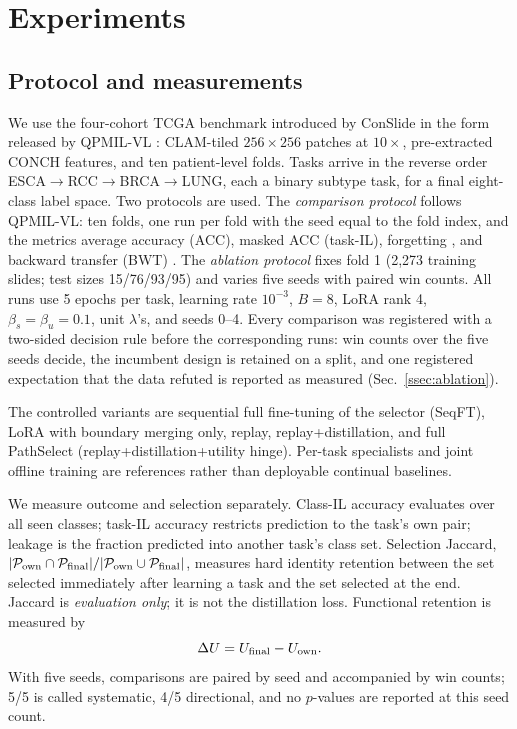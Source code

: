 \documentclass{article}
\newcommand{\Psel}{\mathcal{P}}
\begin{document}
\section{Experiments}
\label{sec:exp}

\subsection{Protocol and measurements}

We use the four-cohort TCGA benchmark introduced by ConSlide \cite{huang2023conslide} in the form released by QPMIL-VL \cite{gou2025qpmil}: CLAM-tiled $256\times256$ patches at $10\times$, pre-extracted CONCH features, and ten patient-level folds. Tasks arrive in the reverse order ESCA$\rightarrow$RCC$\rightarrow$BRCA$\rightarrow$LUNG, each a binary subtype task, for a final eight-class label space. Two protocols are used. The \emph{comparison protocol} follows QPMIL-VL: ten folds, one run per fold with the seed equal to the fold index, and the metrics average accuracy (ACC), masked ACC (task-IL), forgetting \cite{chaudhry2018rwalk}, and backward transfer (BWT) \cite{lopezpaz2017gem}. The \emph{ablation protocol} fixes fold 1 (2,273 training slides; test sizes 15/76/93/95) and varies five seeds with paired win counts.
All runs use 5 epochs per task, learning rate $10^{-3}$, $B=8$, LoRA rank 4, $\beta_s{=}\beta_u{=}0.1$, unit $\lambda$'s, and seeds 0--4. Every comparison was registered with a two-sided decision rule before the corresponding runs: win counts over the five seeds decide, the incumbent design is retained on a split, and one registered expectation that the data refuted is reported as measured (Sec.~\ref{ssec:ablation}).

The controlled variants are sequential full fine-tuning of the selector (SeqFT), LoRA with boundary merging only, replay, replay+distillation, and full PathSelect (replay+distillation+utility hinge).
Per-task specialists and joint offline training are references rather than deployable continual baselines.

We measure outcome and selection separately.
Class-IL accuracy evaluates over all seen classes; task-IL accuracy restricts prediction to the task's own pair; leakage is the fraction predicted into another task's class set.
Selection Jaccard, $|\Psel_{\rm own}\cap\Psel_{\rm final}|/|\Psel_{\rm own}\cup\Psel_{\rm final}|$, measures hard identity retention between the set selected immediately after learning a task and the set selected at the end.
Jaccard is \emph{evaluation only}; it is not the distillation loss.
Functional retention is measured by
\[
\Delta U=U_{\rm final}-U_{\rm own}.
\]
With five seeds, comparisons are paired by seed and accompanied by win counts; 5/5 is called systematic, 4/5 directional, and no $p$-values are reported at this seed count.
\end{document}
